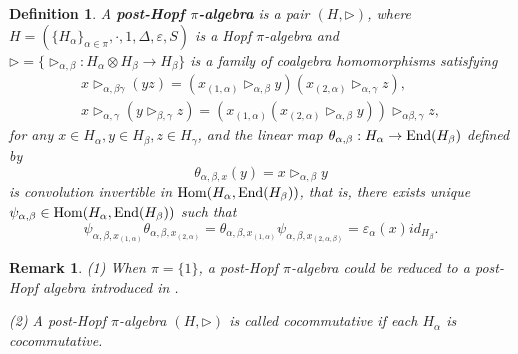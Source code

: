 \documentclass[11pt]{article}
\def\a{\alpha}
\def\b{\beta}
\def\D{\Delta}
\def\g{\gamma}
\def\o{\otimes}
\def\tr{\triangleright}
\def\v{\varepsilon}
\def\End{{\rm End}}
\def\Hom{{\rm Hom}}
\newtheorem{definition}[theorem]{Definition}
\newtheorem{remark}[theorem]{Remark}
\begin{document}
\begin{definition}   \label{defi:pH}
A {\bf post-Hopf $\pi$-algebra} is a pair $(H,\tr)$, where $H=(\{H_\a\}_{\a\in\pi},\cdot,1,\D,\v,S)$ is a Hopf $\pi$-algebra and $\tr=\{\tr_{\a,\b}:H_\a\o H_\b\rightarrow H_\b\}$ is a family of coalgebra homomorphisms satisfying 
\begin{eqnarray}
\label{eq:P1} &x\tr_{\a,\b\g}(yz)=(x_{(1,\a)}\tr_{\a,\b}y)(x_{(2,\a)}\tr_{\a,\g}z),&\\
\label{eq:P2} &x\tr_{\a,\g}(y\tr_{\b,\g}z)=(x_{(1,\a)}(x_{(2,\a)}\tr_{\a,\b}y))\tr_{\a\b,\g}z,&
\end{eqnarray}
for any $x\in H_\a,y\in H_\b,z\in H_\g$, and the linear map $\theta_{\a,\b}:H_\a\rightarrow \End(H_\b)$ defined by
$$\theta_{\a,\b,x}(y)=x\tr_{\a,\b}y$$
is convolution invertible in $\Hom(H_\a,\End(H_\b))$, that is, there exists unique $\psi_{\a,\b}\in\Hom(H_\a,\End(H_\b))$ such that 
\begin{equation}\label{eq:P-con}
  \psi_{\a,\b,x_{(1,\a)}}\theta_{\a,\b,x_{(2,\a)}}=\theta_{\a,\b,x_{(1,\a)}}\psi_{\a,\b,x_{(2,{\a,\b})}}=\v_\a(x)id_{H_\b}.
\end{equation}
\end{definition}

\begin{remark}
(1) When $\pi=\{1\}$, a post-Hopf $\pi$-algebra could be reduced to a post-Hopf algebra introduced in \cite{LST}.

(2) A post-Hopf $\pi$-algebra $(H,\tr)$ is called cocommutative if each $H_\a$ is cocommutative.
\end{remark}
\end{document}
